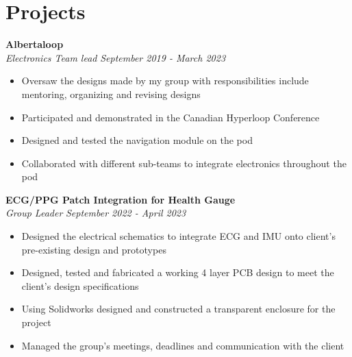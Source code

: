 \documentclass[a4paper,20pt]{article}
\begin{document}
\vspace{-8pt}
\section{Projects}

    \vspace{-1pt}
        \textbf{Albertaloop}
        \vspace{2pt}
        \textit{}\\
        \textit{Electronics Team lead} \hspace{10.2cm}
        \textit{September 2019 - March 2023}
        \vspace{-5pt} 
        \hspace{-10pt}
    \begin{itemize}
        \item Oversaw the designs made by my group with responsibilities include mentoring, organizing and revising designs \vspace{-5pt}
        \item Participated and demonstrated in the Canadian Hyperloop Conference \vspace{-5pt}
        \item Designed and tested the navigation module on the pod \vspace{-5pt} 
        \item Collaborated with different sub-teams to integrate electronics throughout the pod
    \end{itemize}
    \vspace{-1pt}
        \textbf{ECG/PPG Patch Integration for Health Gauge} \\
        \textit{Group Leader} \hspace{11.5cm}
        \textit{September 2022 - April 2023}
        \vspace{-5pt}
    \begin{itemize}
        \item Designed the electrical schematics to integrate ECG and IMU onto client's pre-existing design and prototypes \vspace{-5pt}
        \item Designed, tested and fabricated a working 4 layer PCB design to meet the client's design specifications \vspace{-5pt}
        \item Using Solidworks designed and constructed a transparent enclosure for the project \vspace{-5pt}
        \item Managed the group's meetings, deadlines and communication with the client
    \end{itemize}
\end{document}
